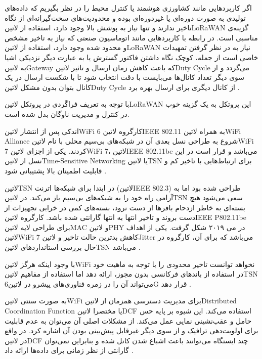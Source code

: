 اگر کاربردهایی مانند کشاورزی هوشمند یا کنترل محیط را در نظر بگیریم که داده‌های تولیدی به صورت دوره‌ای یا غیردوره‌ای بوده و محدودیت‌های سخت‌گیرانه‌ای از نگاه تاخیر ندارند و تنها نیاز به پوشش بالا وجود دارد،
استفاده از ‌لاتین{LoRaWAN} گزینه‌ی مناسبی است. در رابطه با کاربردهایی مانند اتوماسیون صنعتی که نیاز به تاخیر مشخص و محدود شده وجود دارد، استفاده از ‌لاتین{LoRaWAN} نیاز به در نظر گرفتن تمهیدات
خاصی است از جمله، کوچک نگاه داشتن فاکتور گسترش یا به عبارت دیگر نزدیکی اشیا به ‌لاتین{Gateway} که باعث کاهش زمان ارسال و تاثیر ‌لاتین{Duty Cycle} می‌گردد و از سوی دیگر تعداد کانال‌ها می‌بایست
با دقت انتخاب شود تا با شکست ارسال در یک کانال بتوان بدون مشکل ‌لاتین{Duty Cycle} از کانال دیگری برای ارسال بهره برد
.

با توجه به تعریف فراگَردی در پروتکل ‌لاتین{LoRaWAN} این پروتکل به یک گزینه خوب در کنترل و مدیریت ناوگان بدل شده است.


اندکی پس از انتشار ‌لاتین{WiFi 6} کارگروه ‌لاتین{IEEE 802.11} به همراه ‌لاتین{WiFi Alliance} شروع به طراحی نسل بعدی آن در شبکه‌های بی‌سیم محلی با نام ‌لاتین{WiFi 7} کردند.
یکی از اجزای ‌لاتین{WiFi 7}، ‌لاتین{IEEE 802.11be} می‌باشد و قرار است در این نسل از ‌لاتین{Time-Sensitive Networking} یا ‌لاتین{TSN} برای ارتباط‌هایی با تاخیر کم و قابلیت
اطمینان بالا پشتیبانی شود
.

‌لاتین{TSN} در ابتدا برای شبکه‌ها اترنت (‌لاتین{IEEE 802.3}) طراحی شده بود اما به آرامی راه خود را به شبکه‌های بی‌سیم باز می‌کند. در ‌لاتین{TSN} سعی می‌شود
هیچ بسته‌ای به خاطر ازدحام بافرها از دست نرود، بسته‌های کمی در خرابی تجهیزات از دست بروند و تاخیر انتها به انتها گارانتی شده باشد.
کارگروه ‌لاتین{IEEE P802.11be} برای طراحی لایه ‌لاتین{MAC} و ‌لاتین{PHY} در می ۲۰۱۹ شکل گرفت. یکی از اهداف ‌لاتین{WiFi 7} کاهش بدترین حالت تاخیر و ‌لاتین{Jitter} می‌باشد
که برای آن، کارگروه در حال بررسی استانداردهای ‌لاتین{TSN} می‌باشد
.

با وجود اینکه هرگز ‌لاتین{WiFi} نخواهد توانست تاخیر محدودی را با توجه به ماهیت خود در استفاده از باندهای فرکانسی بدون مجوز، ارائه دهد اما استفاده از مفاهیم ‌لاتین{TSN}
می‌تواند آن را در زمره فناوری‌های پیشرو در ‌لاتین{6G} قرار دهد
.

به صورت سنتی ‌لاتین{WiFi} برای مدیریت دسترسی همزمان از ‌لاتین{Distributed Coordination Function} یا مختصرا ‌لاتین{DCF} استفاده می‌کند.
این شیوه بر پایه حس حامل و عقب‌نشینی نمایی عمل می‌کند. از مشکلات اصلی آن می‌توان به عدم قابلیت برای اولویت‌دهی ترافیک و از سوی دیگر غیرقابل پیش‌بینی بودن
آن اشاره کرد. در واقع در ‌لاتین{DCF} چند ایستگاه می‌توانند باعث اشباع شدن کانل شده و بنابراین نمی‌توان گارانتی از نظر زمانی برای داده‌ها ارائه داد
.

